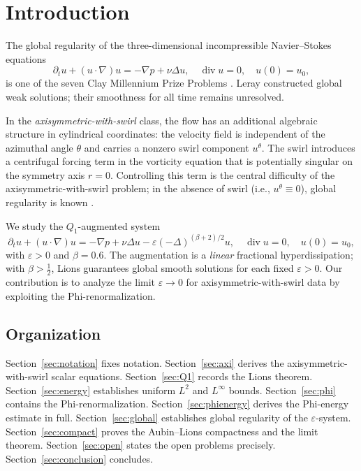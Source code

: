 \documentclass{article}
\theoremstyle{definition}
\theoremstyle{remark}
\newcommand{\e}{\varepsilon}
\begin{document}
\section{Introduction}

The global regularity of the three-dimensional incompressible Navier--Stokes
equations
\begin{equation}\label{eq:NS}
  \partial_t u + (u\cdot\nabla)u = -\nabla p + \nu\Delta u,
  \quad \operatorname{div} u = 0,
  \quad u(0) = u_0,
\end{equation}
is one of the seven Clay Millennium Prize Problems \cite{FeffermanClay}.
Leray \cite{Leray1934} constructed global weak solutions; their smoothness
for all time remains unresolved.

In the \emph{axisymmetric-with-swirl} class, the flow has an additional
algebraic structure in cylindrical coordinates: the velocity field is
independent of the azimuthal angle $\theta$ and carries a nonzero swirl
component $u^\theta$.  The swirl introduces a centrifugal forcing term in
the vorticity equation that is potentially singular on the symmetry axis
$r = 0$.  Controlling this term is the central difficulty of the
axisymmetric-with-swirl problem; in the absence of swirl (i.e., $u^\theta
\equiv 0$), global regularity is known \cite{Ladyzhenskaya,UY1968}.

We study the $Q_1$-augmented system
\begin{equation}\label{eq:NSe}
  \partial_t u + (u\cdot\nabla)u = -\nabla p + \nu\Delta u
  - \e(-\Delta)^{(\beta+2)/2}u,
  \quad \operatorname{div} u = 0,
  \quad u(0) = u_0,
\end{equation}
with $\e > 0$ and $\beta = 0.6$.  The augmentation is a \emph{linear}
fractional hyperdissipation; with $\beta > \frac{1}{2}$, Lions
\cite{Lions1969} guarantees global smooth solutions for each fixed $\e > 0$.
Our contribution is to analyze the limit $\e\to 0$ for axisymmetric-with-swirl
data by exploiting the Phi-renormalization.

\subsection*{Organization}

Section~\ref{sec:notation} fixes notation.
Section~\ref{sec:axi} derives the axisymmetric-with-swirl scalar equations.
Section~\ref{sec:Q1} records the Lions theorem.
Section~\ref{sec:energy} establishes uniform $L^2$ and $L^\infty$ bounds.
Section~\ref{sec:phi} contains the Phi-renormalization.
Section~\ref{sec:phienergy} derives the Phi-energy estimate in full.
Section~\ref{sec:global} establishes global regularity of the $\e$-system.
Section~\ref{sec:compact} proves the Aubin--Lions compactness and the
limit theorem.
Section~\ref{sec:open} states the open problems precisely.
Section~\ref{sec:conclusion} concludes.
\end{document}
